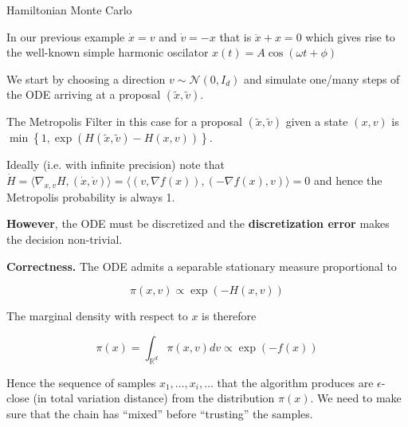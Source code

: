 \documentclass[10pt]{beamer}
\begin{document}
\begin{frame}[allowframebreaks]{Hamiltonian Monte Carlo}
    \medskip
    
    In our previous example $\dot x = v$ and $\dot v = - x$ that is $\ddot x + x = 0$ which gives rise to the well-known simple harmonic oscilator $x(t) = A \cos (\omega t + \phi)$ 
    
    \framebreak
    
    We start by choosing a direction $v \sim \mathcal N(0, I_d)$ and simulate one/many steps of the ODE arriving at a proposal $(\tilde x, \tilde v)$. 
    
    \medskip
    
    The Metropolis Filter in this case for a proposal $(\tilde x, \tilde v)$ given a state $(x, v)$ is $\min \left \{ 1, \exp( H(\tilde x, \tilde v) - H(x, v) ) \right \}$.
    
    \medskip
    
    Ideally (i.e. with infinite precision) note that $\dot H = \langle \nabla_{x, v} H, (\dot x, \dot v) \rangle = \langle (v, \nabla f(x)), (- \nabla f(x), v) \rangle = 0$ and hence the Metropolis probability is always 1. 
    
    \medskip
    
    \textbf{However}, the ODE must be discretized and the \textbf{discretization error} makes the decision non-trivial. 
    
    \framebreak
    
    \textbf{Correctness.} The ODE admits a separable stationary measure proportional to
    
    $$\pi(x, v) \propto \exp(-H(x,v))$$
    
    The marginal density with respect to $x$ is therefore
    
    $$\pi(x) = \int_{\mathbb R^d} \pi(x, v) d v \propto \exp(-f(x))$$
    
    Hence the sequence of samples $x_1, \dots, x_i, \dots$ that the algorithm produces are $\epsilon$-close (in total variation distance) from the distribution $\pi(x)$. We need to make sure that the chain has ``mixed'' before ``trusting'' the samples.
    
    \framebreak
    

\end{frame}
\end{document}
